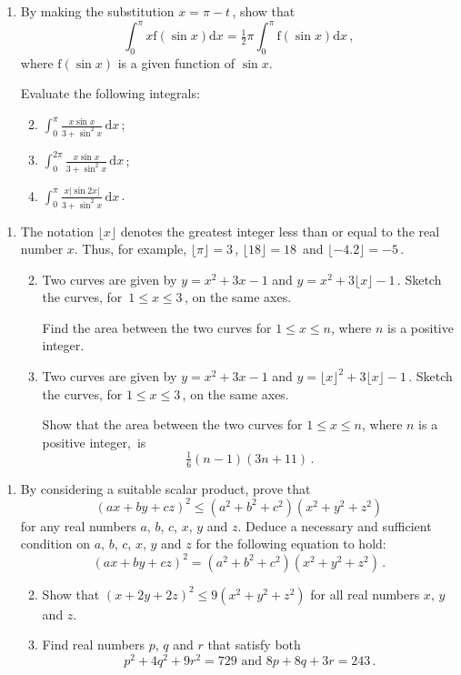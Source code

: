 \documentclass[a4, 11pt]{report}
\newlength{\qspace}
\newcounter{qnumber}
\newenvironment{question}%
 {\vspace{\qspace}
  \begin{enumerate}[\bfseries 1\quad][10]%
    \setcounter{enumi}{\value{qnumber}}%
    \item%
 }
{
  \end{enumerate}
  \filbreak
  \stepcounter{qnumber}
 }
\newenvironment{questionparts}[1][1]%
 {
  \begin{enumerate}[\bfseries (i)]%
    \setcounter{enumii}{#1}
    \addtocounter{enumii}{-1}
    \setlength{\itemsep}{5mm}
    \setlength{\parskip}{8pt}
 }
 {
  \end{enumerate}
 }
\def\d{{\mathrm d}}
\def\f{{\mathrm f}}
\def\le{\leqslant}
\begin{document}
\begin{question}
By making the substitution $x=\pi-t\,$, show that
\[
 \! \int_0^\pi x\f(\sin x) \d x = \tfrac12 \pi \! \int_0^\pi \f(\sin x) \d x\,,
\]
where $\f(\sin x)$ is a given function of $\sin x$.

Evaluate the following integrals:
\begin{questionparts}
 \item $\displaystyle \int_0^\pi \frac {x \sin x}{3+\sin^2 x}\,\d x\,$;
\item  $\displaystyle \int_0^{2\pi} 
\frac {x \sin x}{3+\sin^2 x}\,\d x\,$;
\item   $\displaystyle \int_{0}^{\pi} 
\frac {x \big\vert\sin 2x\big\vert}{3+\sin^2 x}\,\d x\,$.

\end{questionparts}
\end{question}

\begin{question}
The notation ${\boldsymbol \lfloor } x \rfloor$ 
denotes the greatest integer less than or equal to the real
number $x$. Thus, for example, $\lfloor \pi\rfloor =3\,$, $\lfloor
18\rfloor =18\,$ 
and $\lfloor-4.2\rfloor = -5\,$.

\begin{questionparts}
\item Two curves are given by $y= x^2+3x-1$ and 
$y=x^2 +3\lfloor  x\rfloor -1\,$.
Sketch the curves, for~$1\le x \le 3\,$, on the same axes.

Find the area between the two curves for $1\le x \le n$, where 
$n$ is  a positive integer.

\item
Two curves are given by $y= x^2+3x-1$ and $y=\lfloor x\rfloor ^2
+3\lfloor x\rfloor -1\,$.
Sketch the curves, for $1\le x \le 3\,$, on the same axes.

Show that  the area  between the two curves for $1\le x \le n$, where 
$n$ is  a positive integer,~is 
\[
\tfrac 16 (n-1)(3n+11)\,.
\]
\end{questionparts}
	\end{question}
	
\begin{question}
By considering a suitable scalar product, prove that 
\[
(ax+by+cz)^2 \le (a^2+b^2+c^2)(x^2+y^2+z^2)
\]
for any real numbers $a$, $b$, $c$, $x$, $y$ and $z$. Deduce a necessary and 
sufficient condition on  $a$, $b$, $c$, $x$, $y$ and $z$ for
the following equation to hold:
\[
(ax+by+cz)^2 = (a^2+b^2+c^2)(x^2+y^2+z^2) \,.
\]

\begin{questionparts}
\item Show that $(x+2y+2z)^2 \le 9(x^2+y^2+z^2)$ for all real numbers
$x$, $y$ and $z$.
\item Find real numbers $p$, $q$ and $r$ that   satisfy both
\[
p^2+4q^2+9r^2 = 729
 \text{ \ and \ }
8p+8q+3r = 243\,.
\]
\end{questionparts}
\end{question}
	
\end{document}
